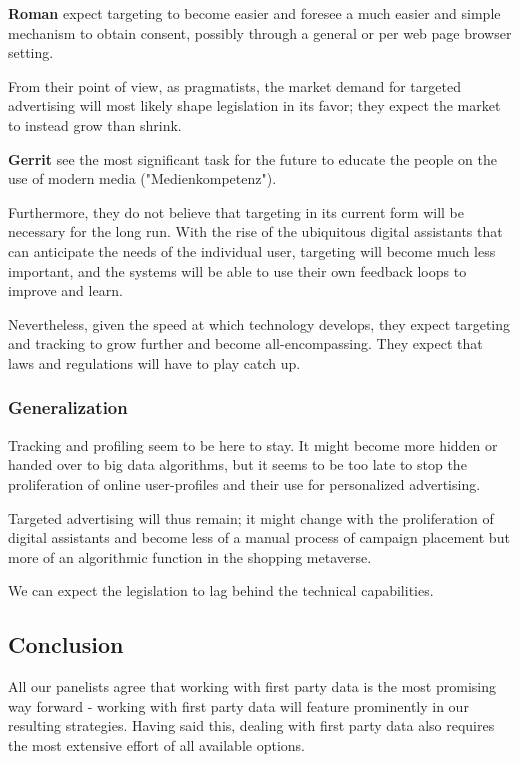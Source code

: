 \textbf{Roman} expect targeting to become easier and foresee a much easier and simple mechanism to obtain consent, possibly through a general or per web page browser setting.

From their point of view, as pragmatists, the market demand for targeted advertising will most likely shape legislation in its favor; they expect the market to instead grow than shrink.

\textbf{Gerrit} see the most significant task for the future to educate the people on the use of modern media ("Medienkompetenz").

Furthermore, they do not believe that targeting in its current form will be necessary for the long run. With the rise of the ubiquitous digital assistants that can anticipate the needs of the individual user, targeting will become much less important, and the systems will be able to use their own feedback loops to improve and learn.

Nevertheless, given the speed at which technology develops, they expect targeting and tracking to grow further and become all-encompassing. They expect that laws and regulations will have to play catch up.

\subsubsection{Generalization}

Tracking and profiling seem to be here to stay. It might become more hidden or handed over to big data algorithms, but it seems to be too late to stop the proliferation of online user-profiles and their use for personalized advertising.

Targeted advertising will thus remain; it might change with the proliferation of digital assistants and become less of a manual process of campaign placement but more of an algorithmic function in the shopping metaverse.

We can expect the legislation to lag behind the technical capabilities.

\subsection{Conclusion}

All our panelists agree that working with first party data is the most promising way forward - working with first party data will feature prominently in our resulting strategies. Having said this, dealing with first party data also requires the most extensive effort of all available options. 

